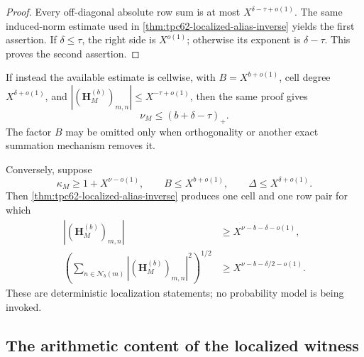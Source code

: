 \begin{proof}
Every off-diagonal absolute row sum is at most
\(X^{\delta-\tau+o(1)}\).  The same induced-norm estimate used in
\cref{thm:tpc62-localized-alias-inverse} yields the first assertion.  If
\(\delta\le\tau\), the right side is \(X^{o(1)}\); otherwise its exponent
is \(\delta-\tau\).  This proves the second assertion.
\end{proof}

If instead the available estimate is cellwise, with
\(B=X^{b+o(1)}\), cell degree \(X^{\delta+o(1)}\), and
\(|(\mathbf H_M^{(b)})_{m,n}|\le X^{-\tau+o(1)}\), then the same proof
gives
\begin{equation}
 \nu_M\le(b+\delta-\tau)_+.
 \label{eq:tpc62-cellwise-exponent-bound}
\end{equation}
The factor \(B\) may be omitted only when orthogonality or another exact
summation mechanism removes it.

Conversely, suppose
\begin{equation}
 \kappa_M\ge1+X^{\nu-o(1)},
 \qquad
 B\le X^{b+o(1)},
 \qquad
 \Delta\le X^{\delta+o(1)}.
 \label{eq:tpc62-exponent-inverse-hypotheses}
\end{equation}
Then \cref{thm:tpc62-localized-alias-inverse} produces one cell and one
row pair for which
\begin{align}
 |(\mathbf H_M^{(b)})_{m,n}|
 &\ge X^{\nu-b-\delta-o(1)},
 \label{eq:tpc62-exponent-pair-witness}\\
 \left(\sum_{n\in\mathcal N_b(m)}
 |(\mathbf H_M^{(b)})_{m,n}|^2\right)^{1/2}
 &\ge X^{\nu-b-\delta/2-o(1)}.
 \label{eq:tpc62-exponent-star-witness}
\end{align}
These are deterministic localization statements; no probability model is
being invoked.

\subsection{The arithmetic content of the localized witness}

